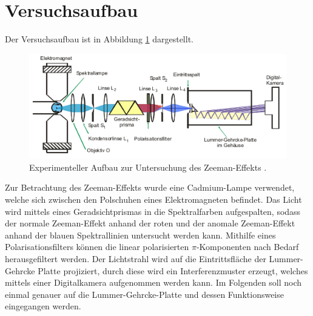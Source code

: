 \section{Versuchsaufbau}
Der Versuchsaufbau ist in Abbildung \ref{fig:tfig5} dargestellt.
\FloatBarrier
\begin{figure}
\centering
\includegraphics[width=\textwidth]{aufbau.png}
\caption{Experimenteller Aufbau zur Untersuchung des Zeeman-Effekts \cite{quelle02}.}
\label{fig:tfig5}
\end{figure}
\FloatBarrier
Zur Betrachtung des Zeeman-Effekts wurde eine Cadmium-Lampe verwendet, welche sich zwischen den Polschuhen eines Elektromagneten befindet. 
Das Licht wird mittels eines Geradsichtprismas in die Spektralfarben aufgespalten, sodass der normale
Zeeman-Effekt anhand der roten und der anomale Zeeman-Effekt anhand der blauen Spektrallinien untersucht werden kann. Mithilfe eines Polarisationsfilters können die linear polarisierten $\pi$-Komponenten
nach Bedarf herausgefiltert werden. Der Lichtstrahl wird auf die Eintrittsfläche der Lummer-Gehrcke Platte projiziert, durch diese wird ein Interferenzmuster erzeugt, 
welches mittels einer Digitalkamera aufgenommen werden kann. Im Folgenden soll noch einmal genauer auf die Lummer-Gehrcke-Platte und dessen Funktionsweise eingegangen werden.

